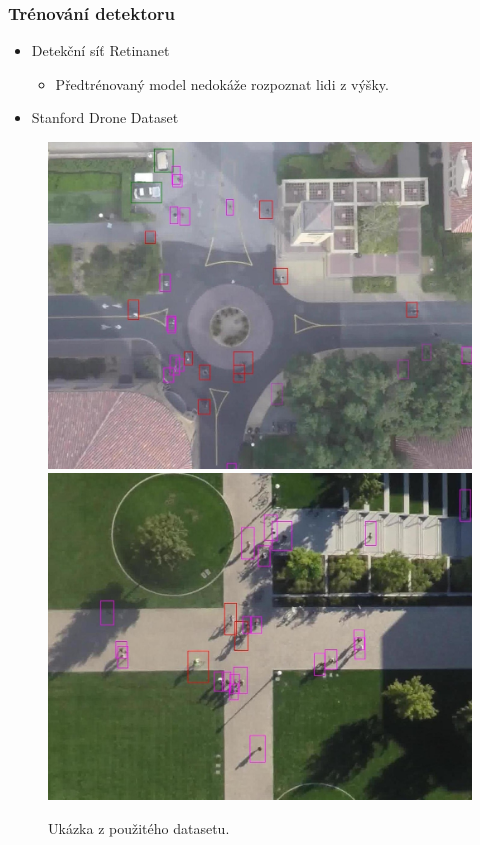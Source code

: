 \documentclass[11pt,xcolor=pdflatex]{beamer}
\begin{document}

\begin{frame}\frametitle{Trénování detektoru}

    \begin{itemize}
        \item Detekční síť Retinanet
        \begin{itemize}
		    \item Předtrénovaný model nedokáže rozpoznat lidi z výšky.
	    \end{itemize}
        \item Stanford Drone Dataset
    \end{itemize}
    
    \begin{figure}[H]
        \centering
        \includegraphics[width=.49\linewidth]{images/dataset_2.jpg}
        \includegraphics[width=.49\linewidth]{images/dataset_3.jpg}
        \caption{Ukázka z použitého datasetu.}
    \end{figure}

\end{frame}


    
    
\end{document}
